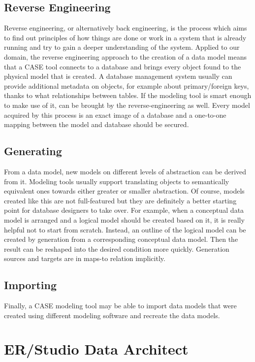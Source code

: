 \subsection{Reverse Engineering}
\label{data_model_reverse_engineering}
Reverse engineering, or alternatively back engineering, is the process which aims to find out principles of how things are done or work in a system that is already running and try to gain a deeper understanding of the system.
Applied to our domain, the reverse engineering approach to the creation of a data model means that a CASE tool connects to a database and brings every object found to the physical model that is created. A database management system usually can provide additional metadata on objects, for example about primary/foreign keys, thanks to what relationships between tables. If the modeling tool is smart enough to make use of it, can be brought by the reverse-engineering as well.
Every model acquired by this process is an exact image of a database and a one-to-one mapping between the model and database should be secured.

\subsection{Generating}
\label{generating}
From a data model, new models on different levels of abstraction can be derived from it. Modeling tools usually support translating objects to semantically equivalent ones towards either greater or smaller abstraction. Of course, models created like this are not full-featured but they are definitely a better starting point for database designers to take over. 
For example, when a conceptual data model is arranged and a logical model should be created based on it, it is really helpful not to start from scratch. Instead, an outline of the logical model can be created by generation from a corresponding conceptual data model. 
Then the result can be reshaped into the desired condition more quickly. 
Generation sources and targets are in maps-to relation implicitly.

\subsection{Importing}
Finally, a CASE modeling tool may be able to import data models that were created using different modeling software and recreate the data models.

\section{ER/Studio Data Architect}

